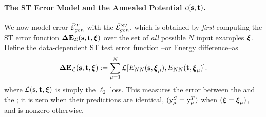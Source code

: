 \paragraph{The ST Error Model and the Annealed Potential $\epsilon({\mathbf{s}}, {\mathbf{t}} )$.}
We now model \Teacher error $\bar{\mathcal{E}}_{gen}^{T}$ with the
\emph{\AverageSTGeneralizationError} $\bar{\mathcal{E}}^{ST}_{gen}$, which is obtained
 by \emph{first} computing the ST error function
$\mathbf{\Delta {E}}_{\mathcal{L}}({\mathbf{s}},{\mathbf{t}},\boldsymbol{\xi})$
over the set of \emph{all} possible $N$ input examples $\boldsymbol{\xi}$.  Define the data-dependent ST test error function
--or Energy difference--as 
\begin{align}
\label{eqn:DE_L}
\mathbf{\Delta {E}}_{\mathcal{L}}({\mathbf{s}},{\mathbf{t}},\boldsymbol{\xi}):=\sum_{\mu=1}^{N}\mathcal{L}[E_{NN}({\mathbf{s}},\boldsymbol{\xi}_{\mu}),E_{NN}({\mathbf{t}},\boldsymbol{\xi}_{\mu})]  .
\end{align}
where $\mathcal{L}({\mathbf{s}},{\mathbf{t}}, \boldsymbol{\xi})$ is simply the $\ell_2$ loss.  This measures the error
between the \Student and the \Teacher; it is zero when their predictions are identical,
$(\mathrm{y}_{\mu}^{S}=\mathrm{y}_{\mu}^{T})$ when $(\boldsymbol{\xi}=\boldsymbol{\xi}_{\mu})$, and is nonzero otherwise.

